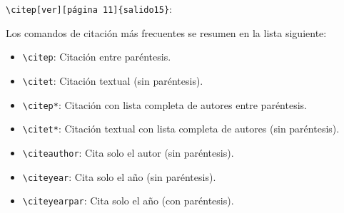 \documentclass[11pt,a4paper]{article}
\begin{document}
   \verb+\citep[ver][página 11]{salido15}+: \citep[ver][página 5]{salido15} 

\newpage
Los comandos de citación más frecuentes se resumen en la lista siguiente:

\begin{itemize}
    \item \verb+\citep+: Citación entre paréntesis.
    \item \verb+\citet+: Citación textual (sin paréntesis).
    \item \verb+\citep*+: Citación con lista completa de autores entre paréntesis.
    \item \verb+\citet*+: Citación textual con lista completa de autores (sin paréntesis).
    \item \verb+\citeauthor+: Cita solo el autor (sin paréntesis).
    \item \verb+\citeyear+: Cita solo el año (sin paréntesis).
    \item \verb+\citeyearpar+: Cita solo el año (con paréntesis).
\end{itemize}

\renewcommand{\refname}{Bibliografía} %


\nocite{*} %

\end{document}
